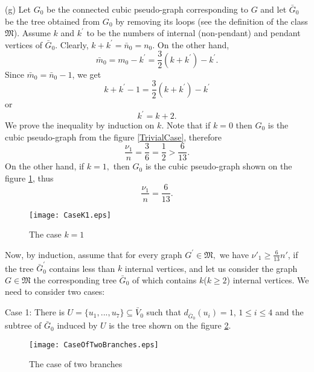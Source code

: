 \documentclass[fleqn,12pt,twoside]{article}
\newenvironment{proof}[1][Proof.]{\begin{trivlist}
\item[\hskip \labelsep {\bfseries #1}]}{\end{trivlist}}
\begin{document}
\begin{proof}
(g) Let $G_{0}$ be the connected cubic pseudo-graph corresponding to
$G$ and let $\bar{G}_{0}$ be the tree obtained from $G_{0}$ by
removing its loops (see the definition of the class $\mathfrak{M}$).
Assume $k$ and $k^{\prime
} $ to be the numbers of internal (non-pendant) and pendant vertices of $\bar{G}_{0}$. Clearly, $k+k^{\prime }=\bar{n}_{0}=n_0$. On the other
hand,
\begin{equation*}
\bar{m}_{0}=m_0 -k^{\prime }=\frac{3}{2}(k+k^{\prime })-k^{\prime
}\text{.}
\end{equation*}Since $\bar{m}_{0}=\bar{n}_{0}-1$, we get
\begin{equation*}
k+k^{\prime }-1=\frac{3}{2}(k+k^{\prime })-k^{\prime }
\end{equation*}or
\begin{equation*}
k^{\prime }=k+2\text{.}
\end{equation*}We prove the inequality by induction on $k$. Note that if $k=0$ then
$G_{0}$ is the cubic pseudo-graph from the figure \ref{TrivialCase},
therefore
\begin{equation*}
\frac{\nu _{1}}{n}=\frac{3}{6}=\frac{1}{2}>\frac{6}{13}\text{.}
\end{equation*}On the other hand, if $k=1,$ then $G_{0}$ is the cubic pseudo-graph
shown on the figure \ref{Case k1}, thus
\begin{equation*}
\frac{\nu _{1}}{n}=\frac{6}{13}.
\end{equation*}

\begin{figure}[h]
\begin{center}
\texttt{[image: CaseK1.eps]}\\
\caption{The case $k=1$}\label{Case k1}
\end{center}
\end{figure}

Now, by induction, assume that for every graph $G^{\prime }\in
\mathfrak{M},$ we have $\nu' _{1}\geq \frac{6}{13}n'$, if the tree
$\bar{G}_{0}^{\prime }$ contains less than $k$ internal vertices,
and let us consider the graph $G\in \mathfrak{M}$ the corresponding
tree $\bar{G}_{0}$ of which contains $k$($k\geq 2$) internal
vertices. We need to consider two cases:

Case 1: There is $U=\{u_{1},...,u_{7}\}\subseteq \bar{V}_{0}$ such that $d_{\bar{G}_{0}}(u_{i})=1$, $1\leq i\leq 4$ and the subtree of
$\bar{G}_{0}$
induced by $U$ is the tree shown on the figure \ref{Case of two branches}.

\begin{figure}[h]
\begin{center}
\texttt{[image: CaseOfTwoBranches.eps]}\\
\caption{The case of two branches}\label{Case of two branches}
\end{center}
\end{figure}


\end{proof}
\end{document}
